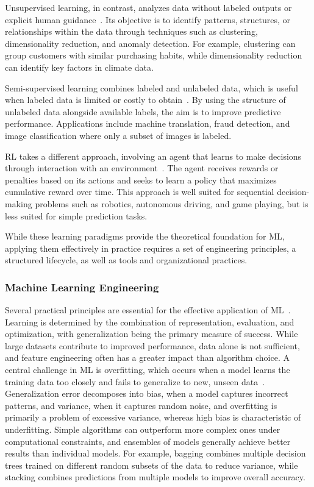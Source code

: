 \documentclass[
english,                 %
bibtex,                  %
]{kththesis}
\numberwithin{listing}{chapter}
\begin{document}
Unsupervised learning, in contrast, analyzes data without labeled outputs or explicit human guidance~\cite{sarker_machine_2021}. Its objective is to identify patterns, structures, or relationships within the data through techniques such as clustering, dimensionality reduction, and anomaly detection. For example, clustering can group customers with similar purchasing habits, while dimensionality reduction can identify key factors in climate data.

Semi-supervised learning combines labeled and unlabeled data, which is useful when labeled data is limited or costly to obtain~\cite{sarker_machine_2021}. By using the structure of unlabeled data alongside available labels, the aim is to improve predictive performance. Applications include machine translation, fraud detection, and image classification where only a subset of images is labeled.

\Gls{RL} takes a different approach, involving an agent that learns to make decisions through interaction with an environment~\cite{arulkumaran_deep_2017}. The agent receives rewards or penalties based on its actions and seeks to learn a policy that maximizes cumulative reward over time. This approach is well suited for sequential decision-making problems such as robotics, autonomous driving, and game playing, but is less suited for simple prediction tasks.

While these learning paradigms provide the theoretical foundation for \gls{ML}, applying them effectively in practice requires a set of engineering principles, a structured lifecycle, as well as tools and organizational practices.

\subsubsection{Machine Learning Engineering}
\label{sec:bg_mle}

Several practical principles are essential for the effective application of \gls{ML}~\cite{domingos_few_2012}. Learning is determined by the combination of representation, evaluation, and optimization, with generalization being the primary measure of success. While large datasets contribute to improved performance, data alone is not sufficient, and feature engineering often has a greater impact than algorithm choice. A central challenge in \gls{ML} is overfitting, which occurs when a model learns the training data too closely and fails to generalize to new, unseen data~\cite{hastie_elements_2009}. Generalization error decomposes into bias, when a model captures incorrect patterns, and variance, when it captures random noise, and overfitting is primarily a problem of excessive variance, whereas high bias is characteristic of underfitting. Simple algorithms can outperform more complex ones under computational constraints, and ensembles of models generally achieve better results than individual models. For example, bagging combines multiple decision trees trained on different random subsets of the data to reduce variance, while stacking combines predictions from multiple models to improve overall accuracy.
\end{document}
